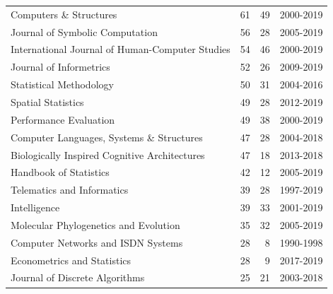\documentclass[12pt]{article}
\begin{document}
\begin{center}
{\begin{longtable}{lrrl}
			Computers \& Structures                                                              &        61 &       49 & 2000-2019 \\
			Journal of Symbolic Computation                                                      &        56 &       28 & 2005-2019 \\
			International Journal of Human-Computer Studies                                      &        54 &       46 & 2000-2019 \\
			Journal of Informetrics                                                              &        52 &       26 & 2009-2019 \\
			Statistical Methodology                                                              &        50 &       31 & 2004-2016 \\
			Spatial Statistics                                                                   &        49 &       28 & 2012-2019 \\
			Performance Evaluation                                                               &        49 &       38 & 2000-2019 \\
			Computer Languages, Systems \& Structures                                            &        47 &       28 & 2004-2018 \\
			Biologically Inspired Cognitive Architectures                                        &        47 &       18 & 2013-2018 \\
			Handbook of Statistics                                                               &        42 &       12 & 2005-2019 \\
			Telematics and Informatics                                                           &        39 &       28 & 1997-2019 \\
			Intelligence                                                                         &        39 &       33 & 2001-2019 \\
			Molecular Phylogenetics and Evolution                                                &        35 &       32 & 2005-2019 \\
			Computer Networks and ISDN Systems                                                   &        28 &        8 & 1990-1998 \\
			Econometrics and Statistics                                                          &        28 &        9 & 2017-2019 \\
			Journal of Discrete Algorithms                                                       &        25 &       21 & 2003-2018 \\

\end{longtable}}
\end{center}
\end{document}
